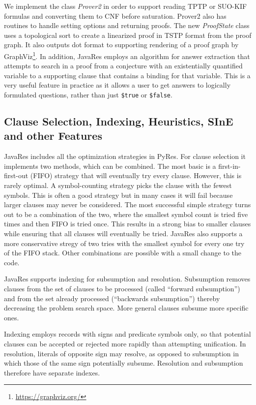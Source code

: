 \documentclass{llncs}
\begin{document}
We implement the class \emph{Prover2} in order to support reading TPTP or
SUO-KIF formulas and converting them to CNF before saturation.
Prover2 also has routines to handle setting options and returning
proofs.  The new \emph{ProofState} class uses a topological sort
\cite{DBLP:journals/cacm/Kahn62} to create a linearized proof in TSTP
format from the proof graph.  It also outputs dot format to supporting
rendering of a proof graph by GraphViz\footnote{\url{https://graphviz.org/}}.
In addition, JavaRes employs an
algorithm for answer extraction that attempts to search in a proof from
a conjecture with an existentially quantified variable to a supporting
clause that contains a binding for that variable.  This is a very useful
feature in practice as it allows a user to get answers to logically
formulated questions, rather than just \texttt{\$true} or \texttt{\$false}.

\subsection{Clause Selection, Indexing, Heuristics, SInE and other Features}

JavaRes includes all the optimization strategies in PyRes.  For clause
selection it implements two methods, which can be combined.  The most
basic is a first-in-first-out (FIFO) strategy that will eventually try every
clause.  However, this is rarely optimal.  A symbol-counting strategy
picks the clause with the fewest symbols.  This is often a good
strategy but in many cases it will fail because larger clauses may
never be considered.  The most successful simple strategy turns out to
be a combination of the two, where the smallest symbol count is tried
five times and then FIFO is tried once.  This results in a strong bias
to smaller clauses while ensuring that all clauses will eventually be
tried.  JavaRes also supports a more conservative stregy of two tries
with the smallest symbol for every one try of the FIFO stack.  Other
combinations are possible with a small change to the code.

JavaRes supports indexing for subsumption and resolution.  Subsumption
removes clauses from the set of clauses to be processed (called
``forward subsumption'') and from the set already processed (``backwards
subsumption'') thereby decreasing the problem search space.  More
general clauses subsume more specific ones.

Indexing employs
records with signs and predicate symbols only, so that potential clauses can
be accepted or rejected more rapidly than attempting unification.  In resolution, literals of opposite sign may resolve,
as opposed to subsumption in which those of the same sign potentially subsume.
Resolution and subsumption therefore have separate indexes.
\end{document}
